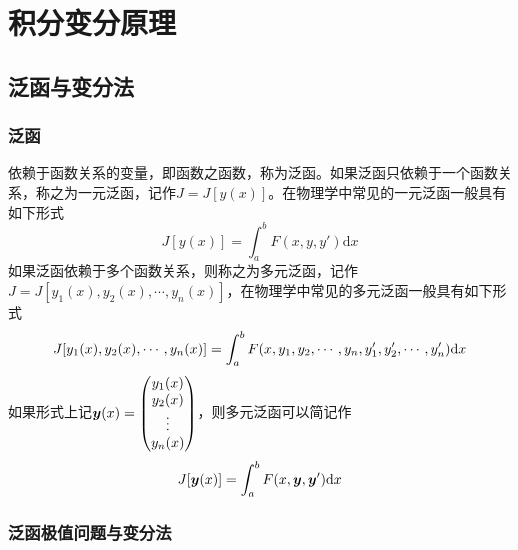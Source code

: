 \chapter{积分变分原理}

\section{泛函与变分法}

\subsection{泛函}

依赖于函数关系的变量，即函数之函数，称为{\heiti 泛函}。如果泛函只依赖于一个函数关系，称之为一元泛函，记作$J = J[y(x)]$。在物理学中常见的一元泛函一般具有如下形式
\begin{equation}
	J[y(x)] = \int_a^b F(x,y,y') \mathrm{d} x
	\label{chapter9:一元泛函的一个常见形式}
\end{equation}
如果泛函依赖于多个函数关系，则称之为多元泛函，记作$J=J[y_1(x),y_2(x),\cdots,y_n(x)]$，在物理学中常见的多元泛函一般具有如下形式
\begin{equation}
	J[y_1(x),y_2(x),\cdots,y_n(x)] = \int_a^b F(x,y_1,y_2,\cdots,y_n,y_1',y_2',\cdots,y_n')\mathrm{d} x
	\label{chapter9:多元泛函的一个常见形式}
\end{equation}
如果形式上记$\boldsymbol{y}(x)=\begin{pmatrix} y_1(x) \\ y_2(x) \\ \vdots \\ y_n(x)\end{pmatrix}$，则多元泛函可以简记作
\begin{equation}
	J[\boldsymbol{y}(x)] = \int_a^b F(x,\boldsymbol{y},\boldsymbol{y}')\mathrm{d} x
\end{equation}

\subsection{泛函极值问题与变分法}\label{chapter9:subsection-泛函极值问题与变分法}

